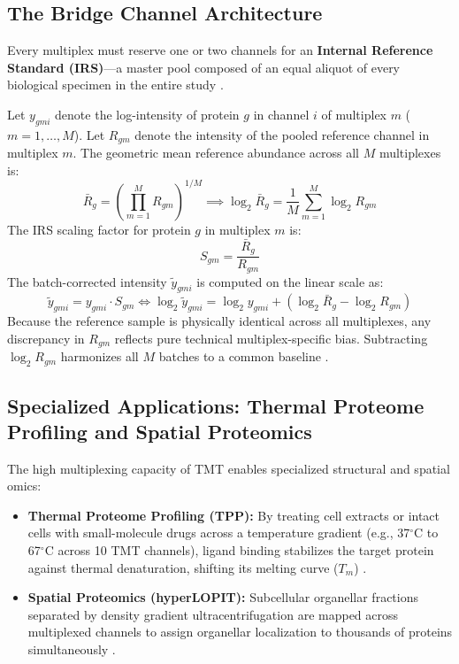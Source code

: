 \documentclass[11pt,oneside]{book}
\begin{document}
\subsection{The Bridge Channel Architecture}
Every multiplex must reserve one or two channels for an \textbf{Internal Reference Standard (IRS)}---a master pool composed of an equal aliquot of every biological specimen in the entire study \cite{plubell2017extended, huang2020msstatstmt}. 

Let $y_{gmi}$ denote the log-intensity of protein $g$ in channel $i$ of multiplex $m$ ($m = 1, \dots, M$). Let $R_{gm}$ denote the intensity of the pooled reference channel in multiplex $m$. The geometric mean reference abundance across all $M$ multiplexes is:
\begin{equation}
\bar{R}_g = \left( \prod_{m=1}^M R_{gm} \right)^{1/M} \implies \log_2 \bar{R}_g = \frac{1}{M} \sum_{m=1}^M \log_2 R_{gm}
\label{eq:geometric_mean_ref}
\end{equation}
The IRS scaling factor for protein $g$ in multiplex $m$ is:
\begin{equation}
S_{gm} = \frac{\bar{R}_g}{R_{gm}}
\label{eq:irs_scaling_factor}
\end{equation}
The batch-corrected intensity $\tilde{y}_{gmi}$ is computed on the linear scale as:
\begin{equation}
\tilde{y}_{gmi} = y_{gmi} \cdot S_{gm} \iff \log_2 \tilde{y}_{gmi} = \log_2 y_{gmi} + \left( \log_2 \bar{R}_g - \log_2 R_{gm} \right)
\label{eq:irs_linear_transform}
\end{equation}
Because the reference sample is physically identical across all multiplexes, any discrepancy in $R_{gm}$ reflects pure technical multiplex-specific bias. Subtracting $\log_2 R_{gm}$ harmonizes all $M$ batches to a common baseline \cite{plubell2017extended}.

\subsection{Specialized Applications: Thermal Proteome Profiling and Spatial Proteomics}
The high multiplexing capacity of TMT enables specialized structural and spatial omics:
\begin{itemize}
    \item \textbf{Thermal Proteome Profiling (TPP):} By treating cell extracts or intact cells with small-molecule drugs across a temperature gradient (e.g., 37$^\circ$C to 67$^\circ$C across 10 TMT channels), ligand binding stabilizes the target protein against thermal denaturation, shifting its melting curve ($T_m$) \cite{savitski2014tpp, mateus2020tpp}.
    \item \textbf{Spatial Proteomics (hyperLOPIT):} Subcellular organellar fractions separated by density gradient ultracentrifugation are mapped across multiplexed channels to assign organellar localization to thousands of proteins simultaneously \cite{christoforou2016draft, obrien2018spatial, gatto2014mass}.
\end{itemize}
\end{document}
